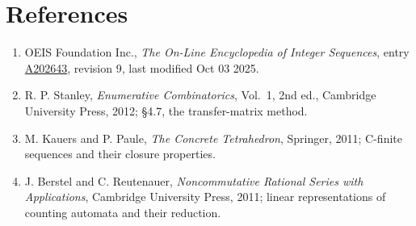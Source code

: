 \documentclass[11pt]{article}
\theoremstyle{definition}
\begin{document}
\section{References}

\begin{enumerate}

\item OEIS Foundation Inc., \emph{The On-Line Encyclopedia of Integer Sequences}, entry \href{https://oeis.org/A202643}{A202643}, revision 9, last modified Oct 03 2025.

\item R. P. Stanley, \emph{Enumerative Combinatorics}, Vol.~1, 2nd ed., Cambridge University Press, 2012; \S4.7, the transfer-matrix method.

\item M. Kauers and P. Paule, \emph{The Concrete Tetrahedron}, Springer, 2011; C-finite sequences and their closure properties.

\item J. Berstel and C. Reutenauer, \emph{Noncommutative Rational Series with Applications}, Cambridge University Press, 2011; linear representations of counting automata and their reduction.

\end{enumerate}
\end{document}
